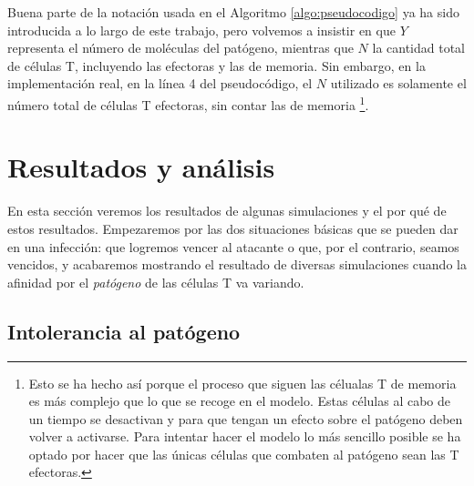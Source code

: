 Buena parte de la notación usada en el Algoritmo \ref{algo:pseudocodigo} ya ha sido introducida a lo largo de este trabajo, pero volvemos a insistir en que $Y$ representa el número de moléculas del patógeno, mientras que $N$ la cantidad total de células T, incluyendo las efectoras y las de memoria. Sin embargo, en la implementación real, en la línea 4 del pseudocódigo, el $N$ utilizado es solamente el número total de células T efectoras, sin contar las de memoria \footnote{Esto se ha hecho así porque el proceso que siguen las célualas T de memoria es más complejo que lo que se recoge en el modelo. Estas células al cabo de un tiempo se desactivan y para que tengan un efecto sobre el patógeno deben volver a activarse. Para intentar hacer el modelo lo más sencillo posible se ha optado por hacer que las únicas células que combaten al patógeno sean las T efectoras.}.

\section{Resultados y análisis}

En esta sección  veremos los resultados de algunas simulaciones y el por qué de estos resultados. Empezaremos por las dos situaciones básicas que se pueden dar en una infección: que logremos vencer al atacante o que, por el contrario, seamos vencidos, y acabaremos mostrando el resultado de diversas simulaciones cuando la afinidad por el \textit{patógeno} de las células T va variando.

\subsection{Intolerancia al patógeno}
\label{sim:intoler}

